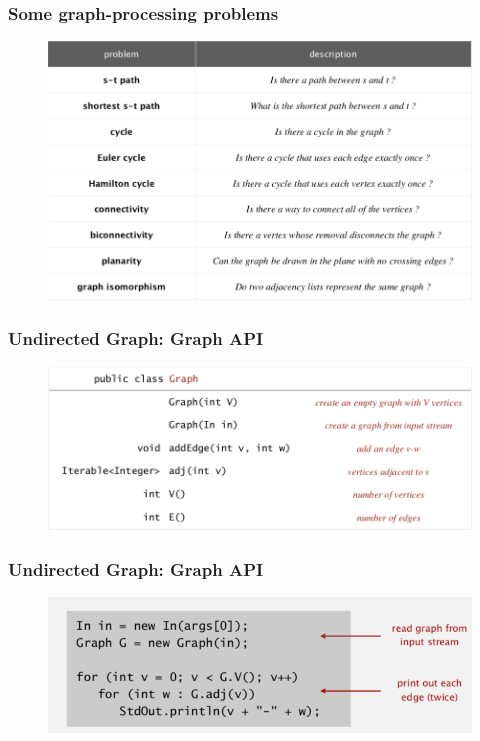 \documentclass[11pt]{beamer}
\begin{document}
  \begin{frame}
	\frametitle	{Some graph-processing problems} 
    \begin{figure}
    	\centering
    	\includegraphics[width=0.95\linewidth]{"Screenshot 2020-11-30 at 9.07.32 PM"}
    	\label{fig:screenshot-2020-11-30-at-9}
    \end{figure}  
\end{frame}

  \begin{frame}
	\frametitle	{Undirected Graph: Graph API} 
    \begin{figure}
    	\centering
    	\includegraphics[width=1.05\linewidth]{"Screenshot 2020-11-30 at 9.47.06 PM"}
    	\label{fig:screenshot-2020-11-30-at-9}
    \end{figure}
\end{frame}

 \begin{frame}
	\frametitle	{Undirected Graph: Graph API} 
    \begin{figure}
    	\centering
    	\includegraphics[width=1\linewidth]{"Screenshot 2020-11-30 at 9.47.22 PM"}
    	\label{fig:screenshot-2020-11-30-at-9}
    \end{figure}   
\end{frame}
\end{document}
